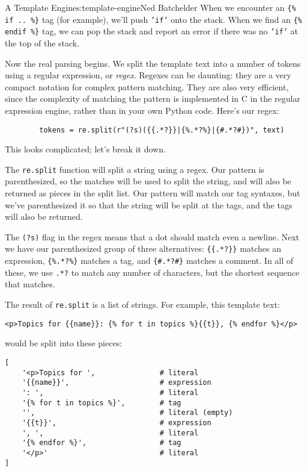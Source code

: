 \begin{aosachapter}{A Template Engine}{s:template-engine}{Ned Batchelder}
When we encounter an \texttt{\{\% if .. \%\}} tag (for example), we'll
push \texttt{'if'} onto the stack. When we find an
\texttt{\{\% endif \%\}} tag, we can pop the stack and report an error
if there was no \texttt{'if'} at the top of the stack.

Now the real parsing begins. We split the template text into a number of
tokens using a regular expression, or \emph{regex}. Regexes can be
daunting: they are a very compact notation for complex pattern matching.
They are also very efficient, since the complexity of matching the
pattern is implemented in C in the regular expression engine, rather
than in your own Python code. Here's our regex:

\begin{verbatim}
        tokens = re.split(r"(?s)({{.*?}}|{%.*?%}|{#.*?#})", text)
\end{verbatim}

This looks complicated; let's break it down.

The \texttt{re.split} function will split a string using a regex. Our
pattern is parenthesized, so the matches will be used to split the
string, and will also be returned as pieces in the split list. Our
pattern will match our tag syntaxes, but we've parenthesized it so that
the string will be split at the tags, and the tags will also be
returned.

The \texttt{(?s)} flag in the regex means that a dot should match even a
newline. Next we have our parenthesized group of three alternatives:
\texttt{\{\{.*?\}\}} matches an expression, \texttt{\{\%.*?\%\}} matches
a tag, and \texttt{\{\#.*?\#\}} matches a comment. In all of these, we
use \texttt{.*?} to match any number of characters, but the shortest
sequence that matches.

The result of \texttt{re.split} is a list of strings. For example, this
template text:

\begin{verbatim}
<p>Topics for {{name}}: {% for t in topics %}{{t}}, {% endfor %}</p>
\end{verbatim}

would be split into these pieces:

\begin{verbatim}
[
    '<p>Topics for ',               # literal
    '{{name}}',                     # expression
    ': ',                           # literal
    '{% for t in topics %}',        # tag
    '',                             # literal (empty)
    '{{t}}',                        # expression
    ', ',                           # literal
    '{% endfor %}',                 # tag
    '</p>'                          # literal
]
\end{verbatim}


\end{aosachapter}
